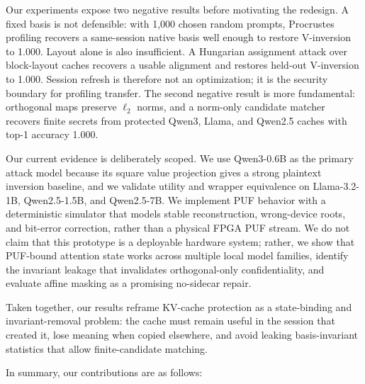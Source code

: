 Our experiments expose two negative results before motivating the redesign. A fixed basis is not defensible: with 1,000 chosen random prompts, Procrustes profiling recovers a same-session native basis well enough to restore V-inversion to 1.000. Layout alone is also insufficient. A Hungarian assignment attack over block-layout caches recovers a usable alignment and restores held-out V-inversion to 1.000. Session refresh is therefore not an optimization; it is the security boundary for profiling transfer. The second negative result is more fundamental: orthogonal maps preserve $\ell_2$ norms, and a norm-only candidate matcher recovers finite secrets from protected Qwen3, Llama, and Qwen2.5 caches with top-1 accuracy 1.000.

Our current evidence is deliberately scoped. We use Qwen3-0.6B as the primary attack model because its square value projection gives a strong plaintext inversion baseline, and we validate utility and wrapper equivalence on Llama-3.2-1B, Qwen2.5-1.5B, and Qwen2.5-7B. We implement PUF behavior with a deterministic simulator that models stable reconstruction, wrong-device roots, and bit-error correction, rather than a physical FPGA PUF stream. We do not claim that this prototype is a deployable hardware system; rather, we show that PUF-bound attention state works across multiple local model families, identify the invariant leakage that invalidates orthogonal-only confidentiality, and evaluate affine masking as a promising no-sidecar repair.

Taken together, our results reframe KV-cache protection as a state-binding and invariant-removal problem: the cache must remain useful in the session that created it, lose meaning when copied elsewhere, and avoid leaking basis-invariant statistics that allow finite-candidate matching.

In summary, our contributions are as follows:

